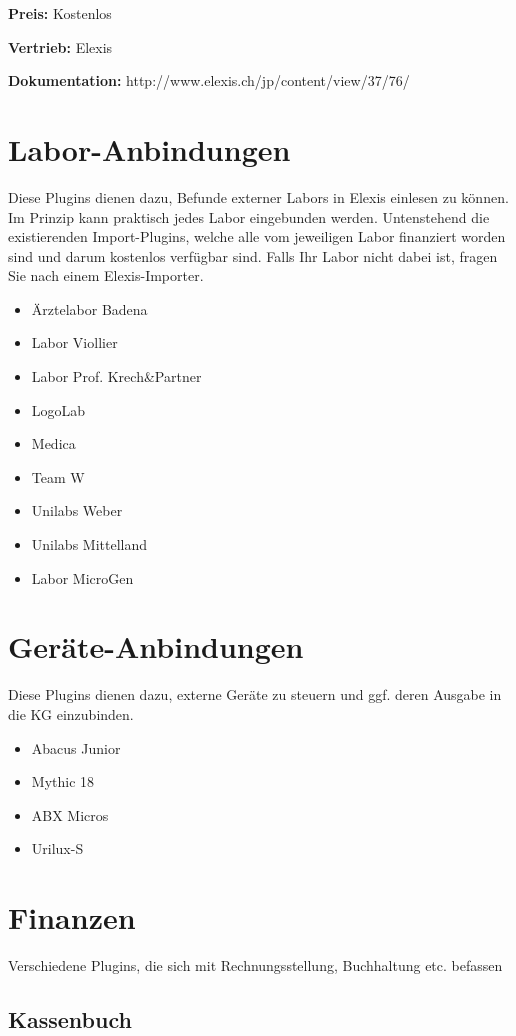 \documentclass[paper=a4,BCOR8.25mm]{scrartcl}
\begin{document}
\textbf{Preis:} Kostenlos

\textbf{Vertrieb:} Elexis

\textbf{Dokumentation:} http://www.elexis.ch/jp/content/view/37/76/

\section{Labor-Anbindungen}
Diese Plugins dienen dazu, Befunde externer Labors in Elexis einlesen zu können. Im Prinzip kann praktisch jedes Labor eingebunden werden. Untenstehend die existierenden Import-Plugins, welche alle vom jeweiligen Labor finanziert worden sind und darum kostenlos verfügbar sind. Falls Ihr Labor nicht dabei ist, fragen Sie nach einem Elexis-Importer.

\begin{itemize}
\item Ärztelabor Badena
\item Labor Viollier
\item Labor Prof. Krech\&Partner
\item LogoLab
\item Medica
\item Team W
\item Unilabs Weber
\item Unilabs Mittelland
\item Labor MicroGen

\end{itemize}

\section{Geräte-Anbindungen}
Diese Plugins dienen dazu, externe Geräte zu steuern und ggf. deren Ausgabe in die KG einzubinden. 
\begin{itemize}
\item Abacus Junior
\item Mythic 18
\item ABX Micros
\item Urilux-S
\end{itemize}

\section{Finanzen}
Verschiedene Plugins, die sich mit Rechnungsstellung, Buchhaltung etc. befassen

\subsection{Kassenbuch}
\end{document}
